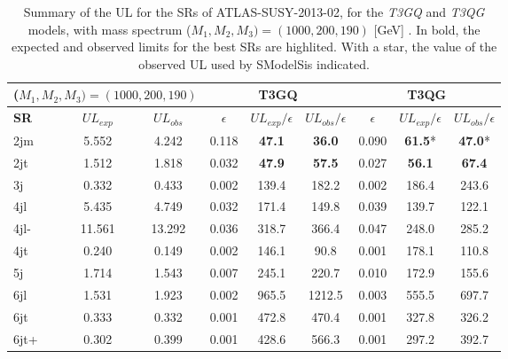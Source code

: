 \documentclass[a4paper,10pt]{article}
\newcommand{\SMO}{{\sc SModelS}}
\begin{document}
\begin{table}[h]
\centering
\renewcommand\arraystretch{1.3} 
\scriptsize
\begin{tabular}{ l c c    c c c  |  c c c  }
\toprule \toprule
\multicolumn{3}{c}{($M_1,M_2,M_3) = (1000,200,190)$} & \multicolumn{3}{c}{ \textbf{T3GQ}} & \multicolumn{3}{c}{ \textbf{T3QG}} \\  \toprule 
\textbf{SR} & $UL_{exp}$ & $UL_{obs}$ & $\epsilon$ &  $UL_{exp}/\epsilon$ & $UL_{obs}/\epsilon$ & $\epsilon$ & $UL_{exp}/ \epsilon$ & $UL_{obs}/ \epsilon$ \\
2jm & 5.552 &  4.242 &  0.118  & \textbf{47.1} &  \textbf{36.0}  &  0.090 &  \textbf{61.5}*  & \textbf{47.0}*\\
2jt  & 1.512  & 1.818 &  0.032  & \textbf{47.9} &  \textbf{57.5}  &  0.027 &  \textbf{56.1}  & \textbf{67.4} \\
3j &  0.332 &  0.433  & 0.002 &  139.4 &  182.2  &  0.002 &  186.4 &  243.6 \\ 
4jl  & 5.435 &  4.749  & 0.032  & 171.4  & 149.8  &  0.039 &  139.7  & 122.1 \\
4jl-  & 11.561 &  13.292 &  0.036  & 318.7 &  366.4  &  0.047 &  248.0 &  285.2 \\
4jt  & 0.240  & 0.149  & 0.002  & 146.1  & 90.8 &   0.001  & 178.1  & 110.8 \\
5j  & 1.714  & 1.543  & 0.007 &  245.1 &  220.7  &  0.010  & 172.9  & 155.6 \\
6jl  & 1.531  & 1.923  & 0.002  & 965.5 &  1212.5  & 0.003  & 555.5 &  697.7 \\
6jt &  0.333  & 0.332 &  0.001  & 472.8  & 470.4 &  0.001 &  327.8  & 326.2 \\
6jt+  & 0.302 &  0.399 &  0.001  & 428.6  & 566.3  & 0.001  & 297.2  & 392.7 \\
\bottomrule \bottomrule
\end{tabular}
\caption{Summary of the UL for the SRs of ATLAS-SUSY-2013-02, for the \textit{T3GQ} and \textit{T3QG} models, with mass spectrum ($M_1,M_2,M_3) = (1000,200,190)$ [GeV] . In bold, the expected and observed limits for the best SRs are highlited. With a star, the value of the observed UL used by \SMO is indicated.}
\label{ATLAS02_UL}
\end{table}
\end{document}

